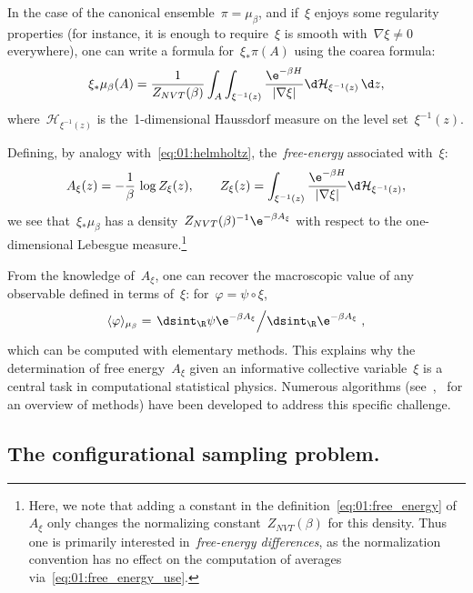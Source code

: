 In the case of the canonical ensemble~$\pi = \mu_\beta$, and if~$\xi$ enjoys some regularity properties (for instance, it is enough to require~$\xi$ is smooth with~$\nabla\xi\neq 0$ everywhere), one can write a formula for~$\xi_*\pi(A)$ using the coarea formula:
\begin{equation}
    \xi_*\mu_\beta(A) = \frac1{Z_{NVT}(\beta)}\int_A\int_{\xi^{-1}(z)}\frac{\e^{-\beta H}}{|\nabla \xi|}\d \mathcal H_{\xi^{-1}(z)}\,\d z,
\end{equation}
where~$\mathcal H_{\xi^{-1}(z)}$ is the~1-dimensional Haussdorf measure on the level set~$\xi^{-1}(z)$.

Defining, by analogy with~\eqref{eq:01:helmholtz}, the~\textit{free-energy} associated with~$\xi$:
\begin{equation}
    \label{eq:01:free_energy}
    A_\xi(z) = -\frac1\beta\,\log Z_\xi(z),\qquad Z_\xi(z) = \int_{\xi^{-1}(z)}\frac{\e^{-\beta H}}{|\nabla \xi|}\d \mathcal H_{\xi^{-1}(z)},
\end{equation}
we see that~$\xi_*\mu_\beta$ has a density~$Z_{NVT}(\beta)^{-1} \e^{-\beta A_\xi}$ with respect to the one-dimensional Lebesgue measure.\footnote{Here, we note that adding a constant in the definition~\eqref{eq:01:free_energy} of~$A_\xi$ only changes the normalizing constant~$Z_{NVT}(\beta)$ for this density. Thus one is primarily interested in~\textit{free-energy differences}, as the normalization convention has no effect on the computation of averages via~\eqref{eq:01:free_energy_use}.}

From the knowledge of~$A_\xi$, one can recover the macroscopic value of any observable defined in terms of~$\xi$: for~$\varphi = \psi\circ\xi$,
\begin{equation}
\label{eq:01:free_energy_use}
\langle \varphi\rangle_{\mu_\beta} = \left.\dsint_\R \psi \e^{-\beta A_\xi} \middle/ \dsint_\R \e^{-\beta A_\xi}\right.,
\end{equation}
which can be computed with elementary methods. This explains why the determination of free energy~$A_\xi$ given an informative collective variable~$\xi$ is a central task in computational statistical physics. Numerous algorithms (see~\cite{LRS10,LRS12},~\cite[Section 4]{LS16} for an overview of methods) have been developed to address this specific challenge.

\subsection{The configurational sampling problem.}
\label{subsec:01:sampling}

